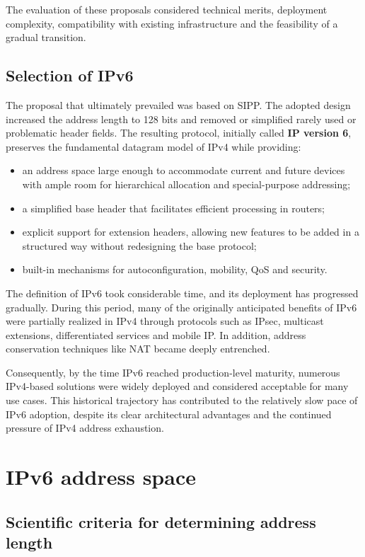 \documentclass[11pt,a4paper,openany]{report}
\begin{document}
The evaluation of these proposals considered technical merits, deployment complexity, compatibility with existing infrastructure and the feasibility of a gradual transition.

\subsection{Selection of IPv6}

The proposal that ultimately prevailed was based on SIPP. The adopted design increased the address length to 128 bits and removed or simplified rarely used or problematic header fields. The resulting protocol, initially called \textbf{IP version 6}, preserves the fundamental datagram model of IPv4 while providing:

\begin{itemize}
\item an address space large enough to accommodate current and future devices with ample room for hierarchical allocation and special-purpose addressing;
\item a simplified base header that facilitates efficient processing in routers;
\item explicit support for extension headers, allowing new features to be added in a structured way without redesigning the base protocol;
\item built-in mechanisms for autoconfiguration, mobility, QoS and security.
\end{itemize}

The definition of IPv6 took considerable time, and its deployment has progressed gradually. During this period, many of the originally anticipated benefits of IPv6 were partially realized in IPv4 through protocols such as IPsec, multicast extensions, differentiated services and mobile IP. In addition, address conservation techniques like NAT became deeply entrenched.

Consequently, by the time IPv6 reached production-level maturity, numerous IPv4-based solutions were widely deployed and considered acceptable for many use cases. This historical trajectory has contributed to the relatively slow pace of IPv6 adoption, despite its clear architectural advantages and the continued pressure of IPv4 address exhaustion.

\section{IPv6 address space}

\subsection{Scientific criteria for determining address length}
\end{document}
